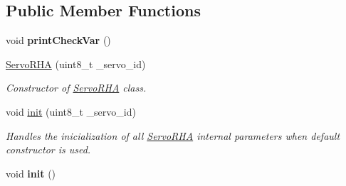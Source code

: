 \subsection*{Public Member Functions}
\begin{DoxyCompactItemize}
\item 
void {\bfseries print\+Check\+Var} ()\hypertarget{classServoRHA_a576063af699490cd5adb2fa212c8f876}{}\label{classServoRHA_a576063af699490cd5adb2fa212c8f876}

\item 
\hyperlink{classServoRHA_a5206bd5b3e7ecfcc142a1ca15d2a5215}{Servo\+R\+HA} (uint8\+\_\+t \+\_\+servo\+\_\+id)
\begin{DoxyCompactList}\small\item\em Constructor of \hyperlink{classServoRHA}{Servo\+R\+HA} class. \end{DoxyCompactList}\item 
void \hyperlink{classServoRHA_ac2c38ebe6cbd04da613d97e19ed5e257}{init} (uint8\+\_\+t \+\_\+servo\+\_\+id)
\begin{DoxyCompactList}\small\item\em Handles the inicialization of all \hyperlink{classServoRHA}{Servo\+R\+HA} internal parameters when default constructor is used. \end{DoxyCompactList}\item 
void {\bfseries init} ()\hypertarget{classServoRHA_abd64398a4d18799952561bd7a5ded082}{}\label{classServoRHA_abd64398a4d18799952561bd7a5ded082}


\end{DoxyCompactItemize}
